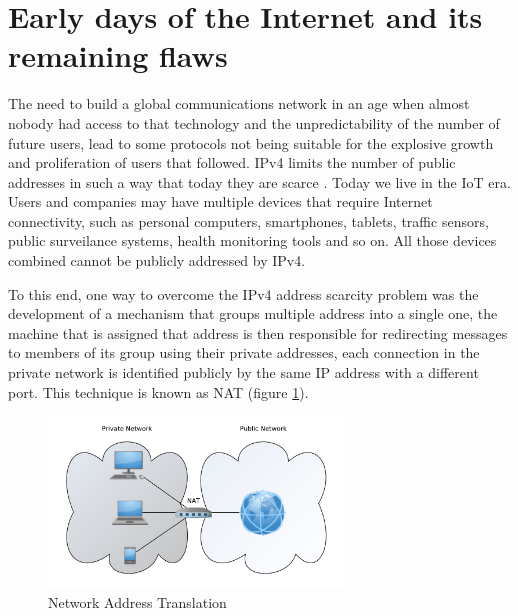 \section{Early days of the Internet and its remaining flaws}\label{early}

The need to build a global communications network in an age when almost nobody had access to that technology and the unpredictability of the number of future users, lead to some protocols not being suitable for the explosive growth and proliferation of users that followed. \ac{IPv4} limits the number of public addresses in such a way that today they are scarce \cite{ipv4}. Today we live in the \ac{IoT} era.
  Users and companies may have multiple devices that require Internet connectivity, such as personal computers, smartphones, tablets, traffic sensors, public surveilance systems, health monitoring tools and so on. All those devices combined cannot be publicly addressed by \ac{IPv4}.

To this end, one way to overcome the \ac{IPv4} address scarcity problem was the development of a mechanism that groups multiple address into a single one, the machine that is assigned that address is then responsible for redirecting messages to members of its group using their private addresses, each connection in the private network is identified publicly by the same \ac{IP} address with a different port.
This technique is known as \ac{NAT} (figure \ref{fig:nat}).

\begin{figure}
	\centering
	\includegraphics[width=0.7\textwidth]{figures/nat.pdf}
	\caption{Network Address Translation}
	\label{fig:nat}
\end{figure}

